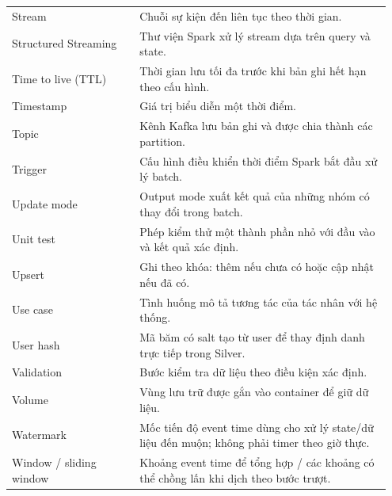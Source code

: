\begin{longtable}{@{}p{0.32\linewidth}p{0.63\linewidth}@{}}
Stream & Chuỗi sự kiện đến liên tục theo thời gian. \\
Structured Streaming & Thư viện Spark xử lý stream dựa trên query và state. \\
Time to live (TTL) & Thời gian lưu tối đa trước khi bản ghi hết hạn theo cấu hình. \\
Timestamp & Giá trị biểu diễn một thời điểm. \\
Topic & Kênh Kafka lưu bản ghi và được chia thành các partition. \\
Trigger & Cấu hình điều khiển thời điểm Spark bắt đầu xử lý batch. \\
Update mode & Output mode xuất kết quả của những nhóm có thay đổi trong batch. \\
Unit test & Phép kiểm thử một thành phần nhỏ với đầu vào và kết quả xác định. \\
Upsert & Ghi theo khóa: thêm nếu chưa có hoặc cập nhật nếu đã có. \\
Use case & Tình huống mô tả tương tác của tác nhân với hệ thống. \\
User hash & Mã băm có salt tạo từ user để thay định danh trực tiếp trong Silver. \\
Validation & Bước kiểm tra dữ liệu theo điều kiện xác định. \\
Volume & Vùng lưu trữ được gắn vào container để giữ dữ liệu. \\
Watermark & Mốc tiến độ event time dùng cho xử lý state/dữ liệu đến muộn; không phải timer theo giờ thực. \\
Window / sliding window & Khoảng event time để tổng hợp / các khoảng có thể chồng lấn khi dịch theo bước trượt. \\
\bottomrule
\end{longtable}
\normalsize
